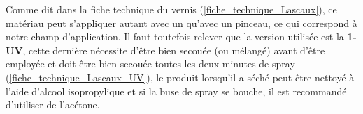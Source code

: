 Comme dit dans la fiche technique du vernis (\ref{fiche_technique_Lascaux}), ce matériau peut s'appliquer autant avec un  qu'avec
un pinceau, ce qui correspond à notre champ d'application. Il faut toutefois relever que la version utilisée est la \textbf{1-UV}, cette dernière nécessite d'être
bien secouée (ou mélangé) avant d'être employée et doit être bien secouée toutes les deux minutes de spray (\ref{fiche_technique_Lascaux_UV}), le produit lorsqu'il a séché
peut être nettoyé à l'aide d'alcool isopropylique et si la buse de spray se bouche, il est recommandé d'utiliser de l'acétone.

\begin{table}[H]
    \centering
    \caption{Table des avantages et inconvénients du vernis Lascaux}
    \label{tab:lascaux_UV}
\end{table}

\newpage

